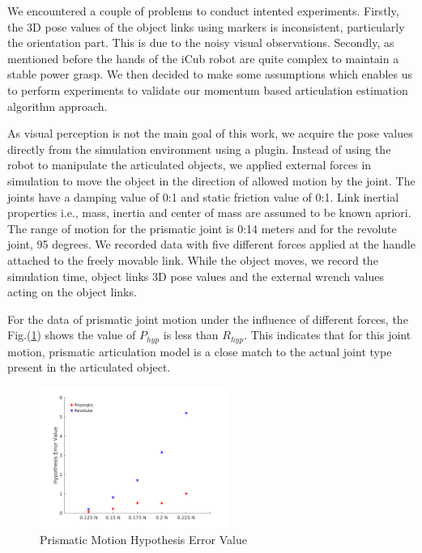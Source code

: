 \documentclass[12pt,a4paper]{report}
\begin{document}
We encountered a couple of problems to conduct intented experiments. Firstly, the 3D pose values of the object links using markers is inconsistent, particularly the orientation part. This is due to the noisy visual observations. Secondly, as mentioned before the hands of the iCub robot are quite complex to maintain a stable power grasp. We then decided to make some assumptions which enables us to perform experiments to validate our momentum based articulation estimation algorithm approach. 

As visual perception is not the main goal of this work, we acquire the pose values directly from the simulation environment using a plugin. Instead of using the robot to manipulate the articulated objects, we applied external forces in simulation to move the object in the direction of allowed motion by the joint. The joints have a damping value of 0:1 and static friction value of 0:1. Link inertial properties i.e., mass, inertia and center of mass are assumed to be known apriori. The range of motion for the prismatic joint is 0:14 meters and for the revolute joint, 95 degrees. We recorded data with five different forces applied at the handle attached to the freely movable link. While the object moves, we record the simulation time, object links 3D pose values and the external wrench values acting on the object links. 

For the data of prismatic joint motion under the influence of different forces, the Fig.(\ref{phypdiff}) shows the value of $P_{hyp}$ is less than $R_{hyp}$. This indicates that for this joint motion, prismatic articulation model is a close match to the actual joint type present in the articulated object.

\begin{figure}[H]
  \centering
  \includegraphics[width=0.55\textwidth]{figures/phypdiff.png}
  \caption{Prismatic Motion Hypothesis Error Value}
  \label{phypdiff}
\end{figure}
\end{document}

